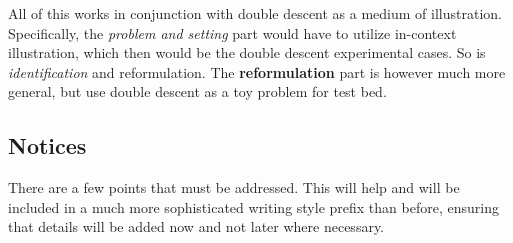 All of this works in conjunction with double descent as a medium of illustration. Specifically, the \textit{problem and setting} part would have to utilize in-context illustration, which then would be the double descent experimental cases. So is \textit{identification} and reformulation. The \textbf{reformulation} part is however much more general, but use double descent as a toy problem for test bed. 

\subsection{Notices}

There are a few points that must be addressed. This will help and will be included in a much more sophisticated writing style prefix than before, ensuring that details will be added now and not later where necessary. 

